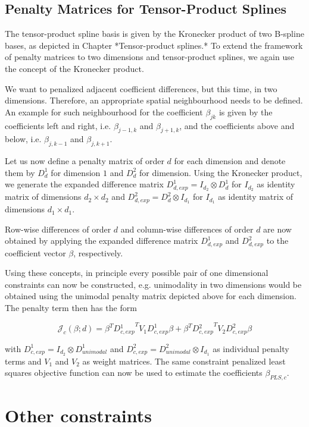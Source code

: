 \documentclass[10pt,a4paper]{article}
\begin{document}
	\subsection{Penalty Matrices for Tensor-Product Splines}
	
	The tensor-product spline basis is given by the Kronecker product of two B-spline bases, as depicted in Chapter *Tensor-product splines.* To extend the framework of penalty matrices to two dimensions and tensor-product splines, we again use the concept of the Kronecker product. 
	
	We want to penalized adjacent coefficient differences, but this time, in two dimensions. Therefore, an appropriate spatial neighbourhood needs to be defined. An example for such neighbourhood for the coefficient $\beta_{jk}$ is given by the coefficients left and right, i.e. $\beta_{j-1, k}$ and $\beta_{j+1, k}$, and the coefficients above and below, i.e. $\beta_{j, k-1}$ and $\beta_{j,k+1}$. 
	
	Let us now define a penalty matrix of order $d$ for each dimension and denote them by $D^1_d$ for dimension $1$ and $D^2_d$ for dimension. Using the Kronecker product, we generate the expanded difference matrix $D_{d, exp}^1 = I_{d_2} \otimes D^1_d$ for $I_{d_2}$ as identity matrix of dimensions $d_2 \times d_2$ and $D_{d,exp}^2 = D^2_d \otimes I_{d_1}$ for $I_{d_1}$ as identity matrix of dimensions $d_1 \times d_1$. 
	
	Row-wise differences of order $d$ and column-wise differences of order $d$ are now obtained by applying the expanded difference matrix $D_{d,exp}^1$ and $D_{d,exp}^2$ to the coefficient vector $\beta$, respectively. 
	
	Using these concepts, in principle every possible pair of one dimensional constraints can now be constructed, e.g. unimodality in two dimensions would be obtained using the unimodal penalty matrix depicted above for each dimension. The penalty term then has the form
	
	$$\mathcal J_c(\beta; d) = \beta^T D{^1_{c,exp}}^T V_1 D_{c,exp}^1 \beta + \beta^T D{^2_{c,exp}}^T V_2 D_{c,exp}^2 \beta$$
	
	with $D_{c,exp}^1 = I_{d_2} \otimes D_{unimodal}^1$ and $D_{c,exp}^2 = D_{unimodal}^2 \otimes I_{d_1}$ as individual penalty terms and $V_1$ and $V_2$ as weight matrices. The same constraint penalized least squares objective function can now be used to estimate the coefficients $\beta_{PLS,c}$.
	
	\section{Other constraints}
	
\end{document}
